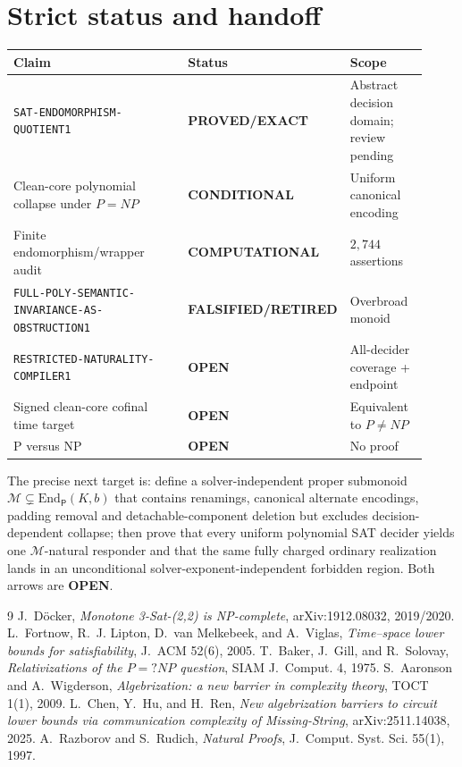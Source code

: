 \documentclass[11pt]{article}
\newcommand{\EXACT}{\textbf{PROVED/EXACT}}
\newcommand{\COMP}{\textbf{COMPUTATIONAL}}
\newcommand{\COND}{\textbf{CONDITIONAL}}
\newcommand{\OPEN}{\textbf{OPEN}}
\newcommand{\RETIRED}{\textbf{FALSIFIED/RETIRED}}
\begin{document}
\section{Strict status and handoff}

\begin{center}\small
\begin{tabular}{>{\raggedright\arraybackslash}p{0.52\linewidth}>{\raggedright\arraybackslash}p{0.19\linewidth}>{\raggedright\arraybackslash}p{0.21\linewidth}}
\toprule
Claim & Status & Scope\\ \midrule
\texttt{SAT-ENDOMORPHISM-QUOTIENT1} & \EXACT & Abstract decision domain; review pending\\
Clean-core polynomial collapse under $P=NP$ & \COND & Uniform canonical encoding\\
Finite endomorphism/wrapper audit & \COMP & $2{,}744$ assertions\\
\texttt{FULL-POLY-SEMANTIC-INVARIANCE-AS-OBSTRUCTION1} & \RETIRED & Overbroad monoid\\
\texttt{RESTRICTED-NATURALITY-COMPILER1} & \OPEN & All-decider coverage + endpoint\\
Signed clean-core cofinal time target & \OPEN & Equivalent to $P\ne NP$\\
P versus NP & \OPEN & No proof\\ \bottomrule
\end{tabular}
\end{center}

The precise next target is: define a solver-independent proper submonoid
$\mathcal M\subsetneq\mathrm{End}_{\mathsf P}(K,b)$ that contains renamings,
canonical alternate encodings, padding removal and detachable-component
deletion but excludes decision-dependent collapse; then prove that every
uniform polynomial SAT decider yields one $\mathcal M$-natural responder and
that the same fully charged ordinary realization lands in an unconditional
solver-exponent-independent forbidden region.  Both arrows are \OPEN.

\begin{thebibliography}{9}
 J.~D\"ocker,
\emph{Monotone 3-Sat-(2,2) is NP-complete}, arXiv:1912.08032, 2019/2020.
 L.~Fortnow, R.~J. Lipton, D.~van Melkebeek, and A.~Viglas,
\emph{Time--space lower bounds for satisfiability}, J.~ACM 52(6), 2005.
 T.~Baker, J.~Gill, and R.~Solovay,
\emph{Relativizations of the $P=?NP$ question}, SIAM J.~Comput. 4, 1975.
 S.~Aaronson and A.~Wigderson,
\emph{Algebrization: a new barrier in complexity theory}, TOCT 1(1), 2009.
 L.~Chen, Y.~Hu, and H.~Ren,
\emph{New algebrization barriers to circuit lower bounds via communication
complexity of Missing-String}, arXiv:2511.14038, 2025.
 A.~Razborov and S.~Rudich,
\emph{Natural Proofs}, J.~Comput. Syst. Sci. 55(1), 1997.
\end{thebibliography}
\end{document}

